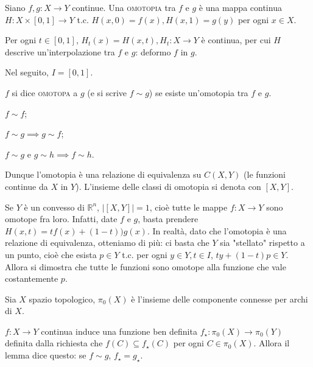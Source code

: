\begin{defn}
  Siano $f, g:X \longrightarrow Y$ continue. Una \textsc{omotopia} tra $f$ e $g$ è una mappa continua $H:X \times [0, 1] \longrightarrow Y$ t.c. $H(x, 0)=f(x), H(x, 1)=g(y)$ per ogni $x \in X$.
\end{defn}

\begin{ftt}
  Per ogni $t \in [0, 1]$, $H_t(x)=H(x, t), H_t:X \longrightarrow Y$ è continua, per cui $H$ descrive un'interpolazione tra $f$ e $g$: deformo $f$ in $g$.
\end{ftt}

Nel seguito, $I=[0, 1]$.

\begin{defn}
  $f$ si dice \textsc{omotopa} a $g$ (e si scrive $f \sim g$) se esiste un'omotopia tra $f$ e $g$.
\end{defn}

\begin{ftt}
  \begin{nlist}
    \item $f \sim f$;
    \item $f \sim g \implies g \sim f$;
    \item $f \sim g$ e $g \sim h \implies f \sim h$.
  \end{nlist}
  Dunque l'omotopia è una relazione di equivalenza su $C(X, Y)$ (le funzioni continue da $X$ in $Y$). L'insieme delle classi di omotopia si denota con $[X, Y]$.
\end{ftt}

\begin{ex}
  Se $Y$ è un convesso di $\mathbb{R}^n$, $\left|[X, Y]\right|=1$, cioè tutte le mappe $f:X \longrightarrow Y$ sono omotope fra loro. Infatti, date $f$ e $g$, basta prendere $H(x, t)=tf(x)+(1-t))g(x)$. In realtà, dato che l'omotopia è una relazione di equivalenza, otteniamo di più: ci basta che $Y$ sia "stellato" rispetto a un punto, cioè che esista $p \in Y$ t.c. per ogni $y \in Y, t \in I$, $ty+(1-t)p \in Y$. Allora si dimostra che tutte le funzioni sono omotope alla funzione che vale costantemente $p$.
\end{ex}

\begin{defn}
  Sia $X$ spazio topologico, $\pi_0(X)$ è l'insieme delle componente connesse per archi di $X$.
\end{defn}

\begin{lm}
  $f:X \longrightarrow Y$ continua induce una funzione ben definita $f_{\star}:\pi_0(X) \longrightarrow \pi_0(Y)$ definita dalla richiesta che $f(C) \subseteq f_{\star}(C)$ per ogni $C \in \pi_0(X)$. Allora il lemma dice questo: se $f \sim g$, $f_{\star}=g_{\star}$.
\end{lm}


